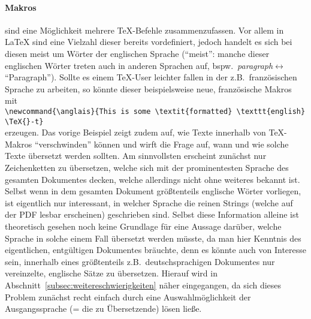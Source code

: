 \paragraph*{Makros} sind eine Möglichkeit mehrere \TeX{}-Befehle zusammenzufassen. Vor allem in \LaTeX{} sind eine Vielzahl dieser bereits vordefiniert, jedoch handelt es sich bei diesen meist um Wörter der englischen Sprache (\enquote{meist}: manche dieser englischen Wörter treten auch in anderen Sprachen auf, bspw.\ \textit{paragraph}$\leftrightarrow$\enquote{Paragraph}). Sollte es einem \TeX{}-User leichter fallen in der z.B.\ französischen Sprache zu arbeiten, so könnte dieser beispielsweise neue, französische Makros mit \\\verb|\newcommand{\anglais}{This is some \textit{formatted} \texttt{english} \TeX{}-t}|\\erzeugen. Das vorige Beispiel zeigt zudem auf, wie Texte innerhalb von \TeX{}-Makros \enquote{verschwinden} können und wirft die Frage auf, wann und wie solche Texte übersetzt werden sollten. Am sinnvollsten erscheint zunächst nur Zeichenketten zu übersetzen, welche sich mit der prominentesten Sprache des gesamten Dokumentes decken, welche allerdings nicht ohne weiteres bekannt ist. Selbst wenn in dem gesamten Dokument größtenteils englische Wörter vorliegen, ist eigentlich nur interessant, in welcher Sprache die reinen Strings (welche auf der PDF lesbar erscheinen) geschrieben sind. Selbst diese Information alleine ist theoretisch gesehen noch keine Grundlage für eine Aussage darüber, welche Sprache in solche einem Fall übersetzt werden müsste, da man hier Kenntnis des eigentlichen, entgültigen Dokumentes bräuchte, denn es könnte auch von Interesse sein, innerhalb eines größtenteils z.B.\ deutschsprachigen Dokumentes nur vereinzelte, englische Sätze zu übersetzen. Hierauf wird in Abschnitt~\ref{subsec:weitereschwierigkeiten} näher eingegangen, da sich dieses Problem zunächst recht einfach durch eine Auswahlmöglichkeit der Ausgangssprache (= die zu Übersetzende) lösen ließe.\\%
\noindent
